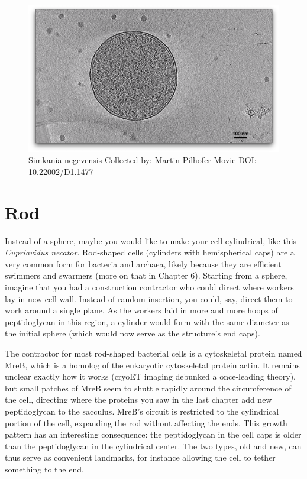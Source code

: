 \documentclass[]{tufte-book}
\begin{document}
\begin{figure}
\includegraphics{movie_stills/3_1} \caption[\protect\hyperlink{tree}{Simkania negevensis} Collected by:
\protect\hyperlink{martin_pilhofer}{Martin Pilhofer} Movie DOI:
\href{https://doi.org/10.22002/D1.1477}{10.22002/D1.1477}]{\protect\hyperlink{tree}{Simkania negevensis} Collected by:
\protect\hyperlink{martin_pilhofer}{Martin Pilhofer} Movie DOI:
\href{https://doi.org/10.22002/D1.1477}{10.22002/D1.1477}}\label{fig:3-1}
\end{figure}

\section{Rod}\label{rod}

Instead of a sphere, maybe you would like to make your cell cylindrical,
like this \emph{Cupriavidus necator}. Rod-shaped cells (cylinders with
hemispherical caps) are a very common form for bacteria and archaea,
likely because they are efficient swimmers and swarmers (more on that in
Chapter 6). Starting from a sphere, imagine that you had a construction
contractor who could direct where workers lay in new cell wall. Instead
of random insertion, you could, say, direct them to work around a single
plane. As the workers laid in more and more hoops of peptidoglycan in
this region, a cylinder would form with the same diameter as the initial
sphere (which would now serve as the structure's end caps).

The contractor for most rod-shaped bacterial cells is a cytoskeletal
protein named MreB, which is a homolog of the eukaryotic cytoskeletal
protein actin. It remains unclear exactly how it works (cryoET imaging
debunked a once-leading theory), but small patches of MreB seem to
shuttle rapidly around the circumference of the cell, directing where
the proteins you saw in the last chapter add new peptidoglycan to the
sacculus. MreB's circuit is restricted to the cylindrical portion of the
cell, expanding the rod without affecting the ends. This growth pattern
has an interesting consequence: the peptidoglycan in the cell caps is
older than the peptidoglycan in the cylindrical center. The two types,
old and new, can thus serve as convenient landmarks, for instance
allowing the cell to tether something to the end.
\end{document}
